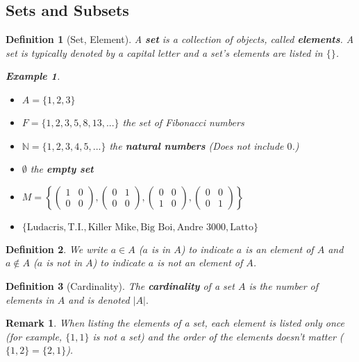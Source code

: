 \documentclass[12pt,a4paper]{article}
\newtheorem{df}{Definition}[subsection]
\newtheorem{eg}{Example}[subsection]
\newtheorem*{rmk}{\indent Remark}
\def\N{{\mathbb{N}}}
\begin{document}
\subsection{Sets and Subsets}
\begin{df}[Set, Element]
	A \textbf{set} is a collection of objects, called \textbf{elements}. A set is typically denoted by a capital letter and a set's elements are listed in $\{\}$.
	\begin{eg}
	\begin{itemize}
		\item $A=\{1,2,3\}$
		\item $F=\{1,2,3,5,8,13,...\}$ the set of Fibonacci numbers
		\item $\N=\{1,2,3,4,5,...\}$ the \textbf{natural numbers} (Does not include $0$.)
		\item $\emptyset$ the \textbf{empty set}
		\item $M=\left\{\begin{pmatrix}1&0\\0&0\end{pmatrix},\begin{pmatrix}0&1\\0&0\end{pmatrix},\begin{pmatrix}0&0\\1&0\end{pmatrix},\begin{pmatrix}0&0\\0&1\end{pmatrix}\right\}$
		\item $\{\text{Ludacris},\text{T.I.},\text{Killer Mike},\text{Big Boi},\text{Andre 3000},\text{Latto}\}$
	\end{itemize}	
	\end{eg}
\end{df}
\begin{df}
	We write $a\in A$ ($a$ is in $A$) to indicate $a$ is an element of $A$ and $a\notin A$ ($a$ is not in $A$) to indicate $a$ is not an element of $A$.	
\end{df}
\begin{df}[Cardinality]
	The \textbf{cardinality} of a set $A$ is the number of elements in $A$ and is denoted $|A|.$
\end{df}
\begin{rmk} When listing the elements of a set, each element is listed only once (for example, $\{1,1\}$ is not a set) and the order of the elements doesn't matter ($\{1,2\}=\{2,1\}$). \end{rmk}
\end{document}
